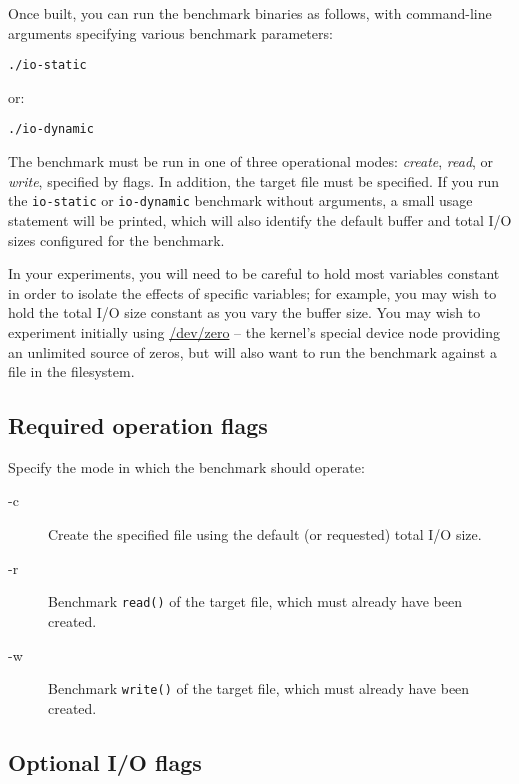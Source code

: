\documentclass[a4paper,10pt]{article}
\begin{document}
Once built, you can run the benchmark binaries as follows, with command-line
arguments specifying various benchmark parameters:

\begin{verbatim}
./io-static
\end{verbatim}

\noindent
or:

\begin{verbatim}
./io-dynamic
\end{verbatim}

The benchmark must be run in one of three operational modes: \textit{create},
\textit{read}, or \textit{write}, specified by flags.
In addition, the target file must be specified.
If you run the \texttt{io-static} or \texttt{io-dynamic} benchmark without
arguments, a small usage statement will be printed, which will also identify
the default buffer and total I/O sizes configured for the benchmark.

In your experiments, you will need to be careful to hold most variables
constant in order to isolate the effects of specific variables; for example,
you may wish to hold the total I/O size constant as you vary the buffer size.
You may wish to experiment initially using \url{/dev/zero} -- the kernel's
special device node providing an unlimited source of zeros, but will also want
to run the benchmark against a file in the filesystem.

\subsection*{Required operation flags}

Specify the mode in which the benchmark should operate:

\begin{description}
\item[-c] Create the specified file using the default (or requested) total
  I/O size.

\item[-r] Benchmark \texttt{read()} of the target file, which must already
  have been created.

\item[-w] Benchmark \texttt{write()} of the target file, which must already
  have been created.
\end{description}

\subsection*{Optional I/O flags}
\end{document}
